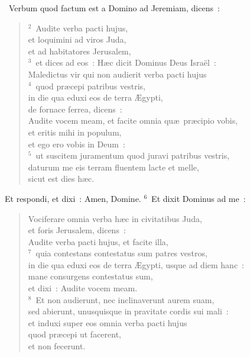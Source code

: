 ~\lettrine[lines=10,image=true,loversize=0.05,lraise=-0.03]{V}{}erbum quod factum est a Domino ad Jeremiam, dicens~:
\begin{flushleft}\begin{verse}\vspace{6pt}${}^{2}$~Audite verba pacti hujus,\\ et loquimini ad viros Juda,\\ et ad habitatores Jerusalem,\\
${}^{3}$~et dices ad eos~: H\ae c dicit Dominus Deus Isra\"el~:\\ Maledictus vir qui non audierit verba pacti hujus\\
${}^{4}$~quod pr\ae cepi patribus vestris,\\ in die qua eduxi eos de terra \AE gypti,\\ de fornace ferrea, dicens~:\\ Audite vocem meam, et facite omnia qu\ae\ pr\ae cipio vobis,\\ et eritis mihi in populum,\\ et ego ero vobis in Deum~:\\
${}^{5}$~ut suscitem juramentum quod juravi patribus vestris,\\ daturum me eis terram fluentem lacte et melle,\\ sicut est dies h\ae c.\end{verse}\end{flushleft}

 Et respondi, et dixi~: Amen, Domine.
${}^{6}$~Et dixit Dominus ad me~: \begin{flushleft}\begin{verse}Vociferare omnia verba h\ae c in civitatibus Juda,\\ et foris Jerusalem, dicens~:\\ Audite verba pacti hujus, et facite illa,\\
${}^{7}$~quia contestans contestatus sum patres vestros,\\ in die qua eduxi eos de terra \AE gypti, usque ad diem hanc~:\\ mane consurgens contestatus sum,\\ et dixi~: Audite vocem meam.\\
${}^{8}$~Et non audierunt, nec inclinaverunt aurem suam,\\ sed abierunt, unusquisque in pravitate cordis sui mali~:\\ et induxi super eos omnia verba pacti hujus\\ quod pr\ae cepi ut facerent,\\ et non fecerunt.\end{verse}\end{flushleft}


